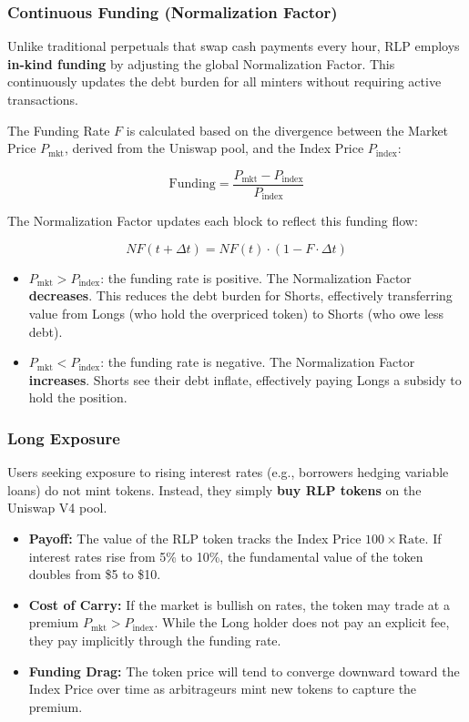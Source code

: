 \documentclass[12pt]{article}
\begin{document}
\subsubsection{Continuous Funding (Normalization Factor)}

Unlike traditional perpetuals that swap cash payments every hour, RLP employs \textbf{in-kind funding} by adjusting the global Normalization Factor. This continuously updates the debt burden for all minters without requiring active transactions.

The Funding Rate $F$ is calculated based on the divergence between the Market Price $P_{\text{mkt}}$, derived from the Uniswap pool, and the Index Price $P_{\text{index}}$:

\begin{equation}
    \text{Funding} = \frac{P_{\text{mkt}} - P_{\text{index}}}{P_{\text{index}}}
\end{equation}

The Normalization Factor updates each block to reflect this funding flow:

\begin{equation}
    NF(t+\Delta t) = NF(t) \cdot (1 - F \cdot \Delta t)
\end{equation}

\begin{itemize}
    \item $P_{\text{mkt}} > P_{\text{index}}$: the funding rate is positive. The Normalization Factor \textbf{decreases}. This reduces the debt burden for Shorts, effectively transferring value from Longs (who hold the overpriced token) to Shorts (who owe less debt).
    \item $P_{\text{mkt}} < P_{\text{index}}$: the funding rate is negative. The Normalization Factor \textbf{increases}. Shorts see their debt inflate, effectively paying Longs a subsidy to hold the position.
\end{itemize}

\subsubsection{Long Exposure}

Users seeking exposure to rising interest rates (e.g., borrowers hedging variable loans) do not mint tokens. Instead, they simply \textbf{buy RLP tokens} on the Uniswap V4 pool.

\begin{itemize}
    \item \textbf{Payoff:} The value of the RLP token tracks the Index Price $100 \times \text{Rate}$. If interest rates rise from 5\% to 10\%, the fundamental value of the token doubles from \$5 to \$10.
    \item \textbf{Cost of Carry:} If the market is bullish on rates, the token may trade at a premium $P_{\text{mkt}} > P_{\text{index}}$. While the Long holder does not pay an explicit fee, they pay implicitly through the funding rate.
    \item \textbf{Funding Drag:} The token price will tend to converge downward toward the Index Price over time as arbitrageurs mint new tokens to capture the premium.
\end{itemize}
\end{document}
